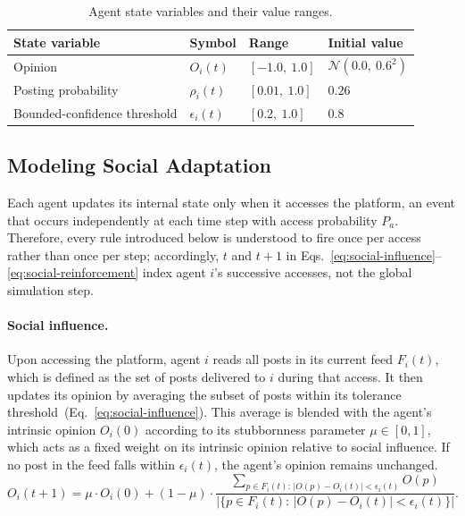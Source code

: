 \documentclass{svproc}
\def\Blue{\color[rgb]{0,0,1}}
\def\Black{\color[rgb]{0,0,0}}
\def\post{\rho}                 %
\def\BoundedConfidence{\epsilon} %
\def\feed{F}                    %
\def\Stubbornness{\mu}           %
\begin{document}

\begin{table}[t]\Blue
\centering
\caption{Agent state variables and their value
  ranges.}\label{tab:state}
\tabcolsep=5pt
\begin{tabular}{llll}
\toprule
State variable & Symbol & Range & Initial value \\
\midrule
Opinion & $O_i(t)$ & $[-1.0,\ 1.0]$ & $\mathcal{N}(0.0,\ 0.6^2)$ \\
Posting probability & $\post_i(t)$ & $[0.01,\ 1.0]$ & $0.26$ \\
Bounded-confidence threshold & $\BoundedConfidence_i(t)$ & $[0.2,\ 1.0]$ & $0.8$ \\
\bottomrule
\end{tabular}\Black
\end{table}



\subsection{Modeling Social Adaptation}\label{sec:model-adaptation}
Each agent updates its internal state only when it accesses the
platform, an event that occurs independently at each time step with
access probability $P_a$. Therefore, every rule introduced below is
understood to fire once per access rather than once per step;
accordingly, $t$ and $t{+}1$ in
Eqs.~\eqref{eq:social-influence}--\eqref{eq:social-reinforcement} index
agent $i$'s successive accesses, not the global simulation step.
\par


\paragraph{Social influence.} 
Upon accessing the platform, agent $i$ reads all posts in its current
feed $\feed_i(t)$, which is defined as the set of posts delivered to
$i$ during that access. It then updates its opinion by averaging the
subset of posts within its tolerance threshold~\cite{friedkin1990}(Eq.~\ref{eq:social-influence}). 
This average is
blended with the agent's intrinsic opinion $O_i(0)$ according to its
stubbornness parameter $\Stubbornness\in[0,1]$, which acts as a fixed
weight on its intrinsic opinion relative to social influence. 
If no post in the feed
falls within $\BoundedConfidence_i(t)$, the agent's opinion remains
unchanged.
%
\begin{equation}
O_i(t{+}1) = \Stubbornness\cdot O_i(0) + (1-\Stubbornness)\cdot\frac{\sum_{p\in \feed_i(t):\,|O(p)-O_i(t)|<\BoundedConfidence_i(t)} O(p)}{\big|\{p\in \feed_i(t):\,|O(p)-O_i(t)|<\BoundedConfidence_i(t)\}\big|}.
\label{eq:social-influence}
\end{equation}
%
\end{document}

